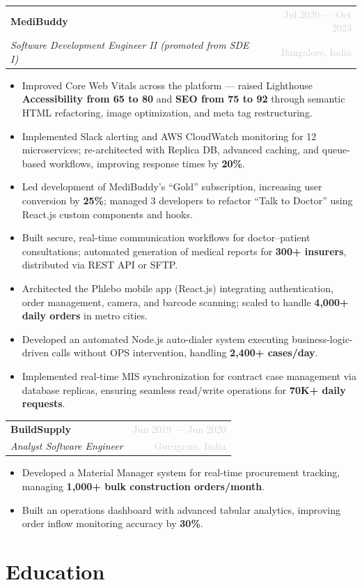 \documentclass[letterpaper,10.5pt]{article}
\newcommand{\resumeItem}[1]{\item\small{#1}}
\newcommand{\resumeSubheading}[4]{
  \vspace{2pt}
  \begin{tabularx}{\textwidth}{Xr}
    \textbf{#1} & \textcolor{lightgray}{\small #2} \\
    \textit{\small #3} & \textcolor{lightgray}{\small #4} \\
  \end{tabularx}
  \vspace{-4pt}
}
\begin{document}
\resumeSubheading
  {MediBuddy}{Jul 2020 --- Oct 2023}
  {Software Development Engineer II (promoted from SDE I)}{Bangalore, India}

\begin{itemize}[leftmargin=14pt, itemsep=1.5pt, parsep=0pt, topsep=4pt]
  \resumeItem{Improved Core Web Vitals across the platform --- raised Lighthouse \textbf{Accessibility from 65 to 80} and \textbf{SEO from 75 to 92} through semantic HTML refactoring, image optimization, and meta tag restructuring.}
  \resumeItem{Implemented Slack alerting and AWS CloudWatch monitoring for 12 microservices; re-architected with Replica DB, advanced caching, and queue-based workflows, improving response times by \textbf{20\%}.}
  \resumeItem{Led development of MediBuddy's ``Gold'' subscription, increasing user conversion by \textbf{25\%}; managed 3 developers to refactor ``Talk to Doctor'' using React.js custom components and hooks.}
  \resumeItem{Built secure, real-time communication workflows for doctor--patient consultations; automated generation of medical reports for \textbf{300+ insurers}, distributed via REST API or SFTP.}
  \resumeItem{Architected the Phlebo mobile app (React.js) integrating authentication, order management, camera, and barcode scanning; scaled to handle \textbf{4,000+ daily orders} in metro cities.}
  \resumeItem{Developed an automated Node.js auto-dialer system executing business-logic-driven calls without OPS intervention, handling \textbf{2,400+ cases/day}.}
  \resumeItem{Implemented real-time MIS synchronization for contract case management via database replicas, ensuring seamless read/write operations for \textbf{70K+ daily requests}.}
\end{itemize}

\resumeSubheading
  {BuildSupply}{Jun 2019 --- Jun 2020}
  {Analyst Software Engineer}{Gurugram, India}

\begin{itemize}[leftmargin=14pt, itemsep=1.5pt, parsep=0pt, topsep=4pt]
  \resumeItem{Developed a Material Manager system for real-time procurement tracking, managing \textbf{1,000+ bulk construction orders/month}.}
  \resumeItem{Built an operations dashboard with advanced tabular analytics, improving order inflow monitoring accuracy by \textbf{30\%}.}
\end{itemize}

\section{Education}
\end{document}
